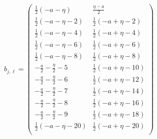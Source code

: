 \documentclass[11pt]{article}
\begin{document}
\begin{align*}
  b_{j,\ell} = 
  \left(
\begin{array}{cc}
 \frac{1}{2} (-a-\eta ) & \frac{\eta -a}{2} \\
 \frac{1}{2} (-a-\eta -2) & \frac{1}{2} (-a+\eta -2) \\
 \frac{1}{2} (-a-\eta -4) & \frac{1}{2} (-a+\eta -4) \\
 \frac{1}{2} (-a-\eta -6) & \frac{1}{2} (-a+\eta -6) \\
 \frac{1}{2} (-a-\eta -8) & \frac{1}{2} (-a+\eta -8) \\
 -\frac{a}{2}-\frac{\eta }{2}-5 & \frac{1}{2} (-a+\eta -10) \\
 -\frac{a}{2}-\frac{\eta }{2}-6 & \frac{1}{2} (-a+\eta -12) \\
 -\frac{a}{2}-\frac{\eta }{2}-7 & \frac{1}{2} (-a+\eta -14) \\
 -\frac{a}{2}-\frac{\eta }{2}-8 & \frac{1}{2} (-a+\eta -16) \\
 -\frac{a}{2}-\frac{\eta }{2}-9 & \frac{1}{2} (-a+\eta -18) \\
 \frac{1}{2} (-a-\eta -20) & \frac{1}{2} (-a+\eta -20) \\
\end{array}
\right)
\end{align*}
\end{document}
